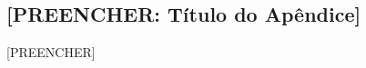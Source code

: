 \begin{apendicesenv}
\partapendices
\chapter{[PREENCHER: Título do Apêndice]}
\label{apend:a}
[PREENCHER]
\end{apendicesenv}
